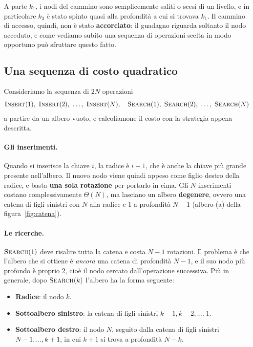 \noindent
A parte $k_1$, i nodi del cammino sono semplicemente saliti o scesi di un livello, e in particolare $k_3$ è stato spinto quasi alla profondità a cui si trovava $k_1$. Il cammino di accesso, quindi, non è stato \textbf{accorciato}: il guadagno riguarda soltanto il nodo acceduto, e come vediamo subito una sequenza di operazioni scelta in modo opportuno può sfruttare questo fatto.

\subsection{Una sequenza di costo quadratico}\label{sec:controesempio}
Consideriamo la sequenza di $2N$ operazioni
\[
\Insert(1),\ \Insert(2),\ \dots,\ \Insert(N),\quad \Search(1),\ \Search(2),\ \dots,\ \Search(N)
\]
a partire da un albero vuoto, e calcoliamone il costo con la strategia appena descritta.

\paragraph{Gli inserimenti.}
Quando si inserisce la chiave $i$, la radice è $i-1$, che è anche la chiave più grande presente nell'albero. Il nuovo nodo viene quindi appeso come figlio destro della radice, e basta \textbf{una sola rotazione} per portarlo in cima. Gli $N$ inserimenti costano complessivamente $\Theta(N)$, ma lasciano un albero \textbf{degenere}, ovvero una catena di figli sinistri con $N$ alla radice e $1$ a profondità $N-1$ (albero (a) della figura~\ref{fig:catena}).

\paragraph{Le ricerche.}
$\textsc{Search}(1)$ deve risalire tutta la catena e costa $N-1$ rotazioni. Il problema è che l'albero che si ottiene è \emph{ancora} una catena di profondità $N-1$, e il suo nodo più profondo è proprio $2$, cioè il nodo cercato dall'operazione successiva. Più in generale, dopo $\textsc{Search}(k)$ l'albero ha la forma seguente:
\begin{itemize}
    \item \textbf{Radice}: il nodo $k$.
    \item \textbf{Sottoalbero sinistro}: la catena di figli sinistri $k-1, k-2, \dots, 1$.
    \item \textbf{Sottoalbero destro}: il nodo $N$, seguito dalla catena di figli sinistri $N-1, \dots, k+1$, in cui $k+1$ si trova a profondità $N-k$.
\end{itemize}

